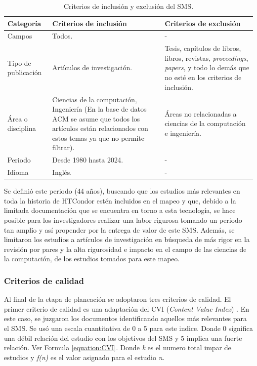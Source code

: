 \begin{table}[htbp]
	\centering
	\caption{Criterios de inclusión y exclusión del SMS.}
	\label{table:Criteria}
	\renewcommand{\arraystretch}{1}  %
	\begin{tabular}{p{2.7cm}p{7cm}p{7cm}}
		\toprule
		\textbf{Categoría} & \textbf{Criterios de inclusión} & \textbf{Criterios de exclusión}\\
		\midrule
		Campos & Todos. & -\\
		\addlinespace[0.8em]
		Tipo de publicación & Artículos de investigación. & Tesis, capítulos de libros, libros, revistas, \textit{proceedings}, \textit{papers}, y todo lo demás que no esté en los criterios de inclusión.\\
        \addlinespace[0.8em]
		Área o disciplina   & Ciencias de la computación, Ingeniería (En la base de datos ACM se asume que todos los artículos están relacionados con estos temas ya que no permite filtrar). & Áreas no relacionadas a ciencias de la computación e ingeniería.\\
        \addlinespace[0.8em]
		Periodo & Desde 1980 hasta 2024. & -\\
        \addlinespace[0.8em]
		Idioma & Inglés. & -\\
		\bottomrule
	\end{tabular}
\end{table}

Se definió este periodo (44 años), buscando que los estudios más relevantes en toda la historia de HTCondor estén incluidos en el mapeo y que, debido a la limitada documentación que se encuentra en torno a esta tecnología, se hace posible para los investigadores realizar una labor rigurosa tomando un periodo tan amplio y así propender por la entrega de valor de este SMS. Además, se limitaron los estudios a artículos de investigación en búsqueda de más rigor en la revisión por pares y la alta rigurosidad e impacto en el campo de las ciencias de la computación, de los estudios tomados para este mapeo.

\subsubsection{Criterios de calidad}
Al final de la etapa de planeación se adoptaron tres criterios de calidad.
El primer criterio de calidad es una adaptación del CVI (\textit{Content Value Index}) \cite{Almanasreh2019214, yaghmaei2003content}. En este caso, se juzgaron los documentos identificando aquellos más relevantes para el SMS. Se usó una escala cuantitativa de 0 a 5 para este indice. Donde 0 significa una débil relación del estudio con los objetivos del SMS y 5 implica una fuerte relación. Ver Formula \ref{equation:CVI}. Donde \textit{k} es el numero total impar de estudios y \textit{f(n)} es el valor asignado para el estudio \textit{n}.

